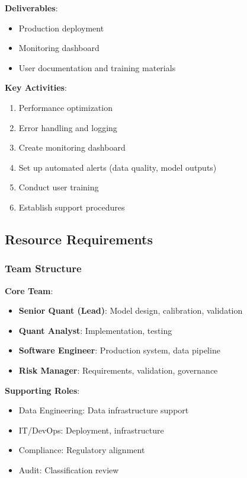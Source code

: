 \documentclass[11pt,a4paper]{article}
\begin{document}
\textbf{Deliverables}:
\begin{itemize}
    \item Production deployment
    \item Monitoring dashboard
    \item User documentation and training materials
\end{itemize}

\textbf{Key Activities}:
\begin{enumerate}
    \item Performance optimization
    \item Error handling and logging
    \item Create monitoring dashboard
    \item Set up automated alerts (data quality, model outputs)
    \item Conduct user training
    \item Establish support procedures
\end{enumerate}

\subsection{Resource Requirements}

\subsubsection{Team Structure}

\textbf{Core Team}:
\begin{itemize}
    \item \textbf{Senior Quant (Lead)}: Model design, calibration, validation
    \item \textbf{Quant Analyst}: Implementation, testing
    \item \textbf{Software Engineer}: Production system, data pipeline
    \item \textbf{Risk Manager}: Requirements, validation, governance
\end{itemize}

\textbf{Supporting Roles}:
\begin{itemize}
    \item Data Engineering: Data infrastructure support
    \item IT/DevOps: Deployment, infrastructure
    \item Compliance: Regulatory alignment
    \item Audit: Classification review
\end{itemize}
\end{document}
